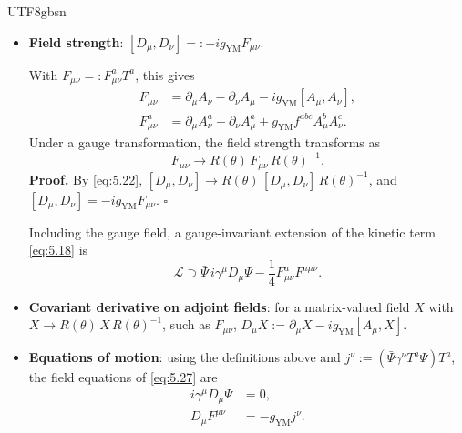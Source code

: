 \documentclass[11pt,a4paper,oneside]{report}
\begin{document}
\begin{CJK*}{UTF8}{gbsn}
\begin{itemize}
Then, by \eqref{eq:5.22}, $A_\mu$ must transform as
\begin{equation*}
A_\mu\to R(\theta)\,A_\mu\,R(\theta)^{-1}-\frac{i}{g_{\mathrm{YM}}}\bigl(\partial_\mu R(\theta)\bigr)R(\theta)^{-1}.
\tag{5.24}\label{eq:5.24}
\end{equation*}

\item \textbf{\boldmath Field strength}: $[D_\mu,D_\nu]=:-ig_{\mathrm{YM}}F_{\mu\nu}$.

With $F_{\mu\nu}=:F_{\mu\nu}^aT^a$, this gives
\begin{equation*}
\begin{aligned}
F_{\mu\nu}&=\partial_\mu A_\nu-\partial_\nu A_\mu-ig_{\mathrm{YM}}[A_\mu,A_\nu],\\
F_{\mu\nu}^a&=\partial_\mu A_\nu^a-\partial_\nu A_\mu^a+g_{\mathrm{YM}}f^{abc}A_\mu^bA_\nu^c.
\end{aligned}
\tag{5.25}\label{eq:5.25}
\end{equation*}
Under a gauge transformation, the field strength transforms as
\begin{equation*}
F_{\mu\nu}\to R(\theta)\,F_{\mu\nu}\,R(\theta)^{-1}.
\tag{5.26}\label{eq:5.26}
\end{equation*}
\textbf{\boldmath Proof.} By \eqref{eq:5.22}, $[D_\mu,D_\nu]\to R(\theta)\,[D_\mu,D_\nu]\,R(\theta)^{-1}$, and $[D_\mu,D_\nu]=-ig_{\mathrm{YM}}F_{\mu\nu}$. $\square$

Including the gauge field, a gauge-invariant extension of the kinetic term \eqref{eq:5.18} is
\begin{equation*}
{\displaystyle 
\mathcal L\supset\bar\Psi\,i\gamma^\mu D_\mu\Psi-\frac14F_{\mu\nu}^aF^{a\mu\nu}.
}
\tag{5.27}\label{eq:5.27}
\end{equation*}

\item \textbf{\boldmath Covariant derivative on adjoint fields}: for a matrix-valued field $X$ with $X\to R(\theta)\,X\,R(\theta)^{-1}$, such as $F_{\mu\nu}$, $D_\mu X:=\partial_\mu X-ig_{\mathrm{YM}}[A_\mu,X]$.

\item \textbf{\boldmath Equations of motion}: using the definitions above and $j^\nu:=(\bar\Psi\gamma^\nu T^a\Psi)T^a$, the field equations of \eqref{eq:5.27} are
\begin{equation*}
{\displaystyle 
\begin{aligned}
i\gamma^\mu D_\mu\Psi&=0,\\
D_\mu F^{\mu\nu}&=-g_{\mathrm{YM}}j^\nu.
\end{aligned}
}
\tag{5.28}\label{eq:5.28}
\end{equation*}
\end{itemize}


\end{CJK*}
\end{document}
